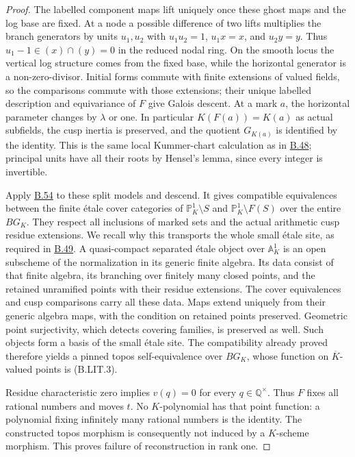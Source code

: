 \documentclass[11pt,a4paper]{article}
\newcommand{\statementref}[1]{\hyperlink{#1}{#1}}
\begin{document}
\begin{proof}
The labelled component maps lift uniquely once these ghost maps
and the log base are fixed. At a node a possible difference of
two lifts multiplies the branch generators by units $u_1,u_2$
with $u_1u_2=1$, $u_1x=x$, and $u_2y=y$. Thus
$u_1-1\in(x)\cap(y)=0$ in the reduced nodal ring. On the
smooth locus the vertical log structure comes from the fixed
base, while the horizontal generator is a non-zero-divisor.
Initial forms commute with finite extensions of valued fields,
so the comparisons commute with those extensions; their unique
labelled description and equivariance of $F$ give Galois descent.
At a mark $a$, the horizontal parameter changes by $\lambda$
or one. In particular $K(F(a))=K(a)$ as actual subfields,
the cusp inertia is preserved, and the quotient $G_{K(a)}$ is
identified by the identity. This is the same local Kummer-chart
calculation as in \statementref{B.48}; principal units have all
their roots by Hensel's lemma, since every integer is invertible.

Apply \statementref{B.54} to these split models and descend.
It gives compatible equivalences between the finite \'etale
cover categories of $\mathbb P^1_K\setminus S$ and
$\mathbb P^1_K\setminus F(S)$ over the entire $BG_K$.
They respect all inclusions of marked sets and the actual
arithmetic cusp residue extensions. We recall why this transports
the whole small \'etale site, as required in
\statementref{B.49}. A quasi-compact separated \'etale object
over $\mathbb A^1_K$ is an open subscheme of the normalization
in its generic finite algebra. Its data consist of that finite
algebra, its branching over finitely many closed points, and the
retained unramified points with their residue extensions.
The cover equivalences and cusp comparisons carry all these
data. Maps extend uniquely from their generic algebra maps,
with the condition on retained points preserved. Geometric
point surjectivity, which detects covering families, is preserved
as well. Such objects form a basis of the small \'etale site.
The compatibility already proved therefore yields a pinned
topos self-equivalence over $BG_K$, whose function on
$\overline K$-valued points is (B.LIT.3).

Residue characteristic zero implies $v(q)=0$ for every
$q\in\mathbb Q^\times$. Thus $F$ fixes all rational numbers
and moves $t$. No $K$-polynomial has that point function: a
polynomial fixing infinitely many rational numbers is the
identity. The constructed topos morphism is consequently not
induced by a $K$-scheme morphism. This proves failure of
reconstruction in rank one.


\end{proof}
\end{document}
